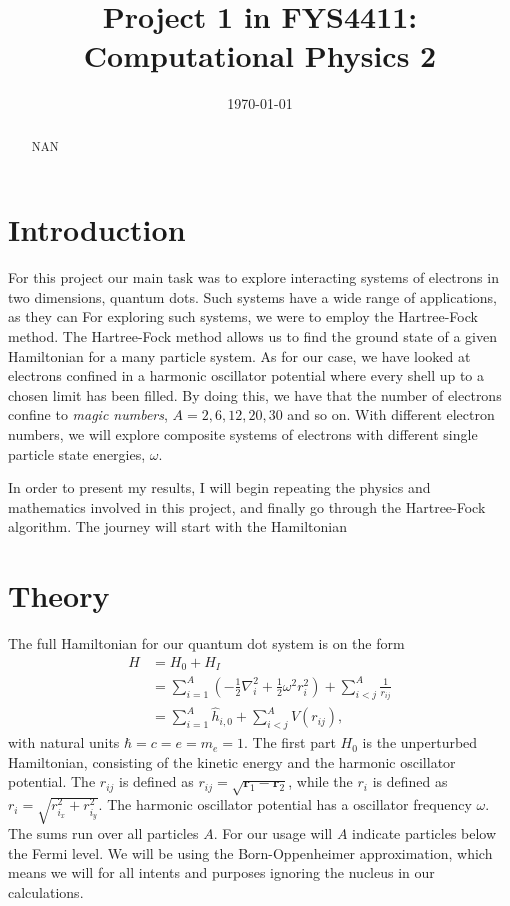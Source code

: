 \documentclass[11pt]{article}
\title{Project 1 in FYS4411: Computational Physics 2}
\author{}
\date{\today}
\begin{document}
\maketitle

\begin{abstract}
NAN
\end{abstract}

\section{Introduction}
For this project our main task was to explore interacting systems of electrons in two dimensions, quantum dots. Such systems have a wide range of applications, as they can  For exploring such systems, we were to employ the Hartree-Fock method. The Hartree-Fock method allows us to find the ground state of a given Hamiltonian for a many particle system. As for our case, we have looked at electrons confined in a harmonic oscillator potential where every shell up to a chosen limit has been filled. By doing this, we have that the number of electrons confine to \textit{magic numbers}, $A = 2, 6, 12, 20, 30$ and so on. With different electron numbers, we will explore composite systems of electrons with different single particle state energies, $\omega$.

In order to present my results, I will begin repeating the physics and mathematics involved in this project, and finally go through the Hartree-Fock algorithm. The journey will start with the Hamiltonian


\section{Theory}
The full Hamiltonian for our quantum dot system is on the form
\begin{align}
	H &= H_0 + H_I \nonumber \\
	&= \sum^A_{i=1} \left( -\frac{1}{2}\nabla^2_i + \frac{1}{2}\omega^2 r^2_i \right) + \sum^A_{i<j}\frac{1}{r_{ij}} \\
	&= \sum^A_{i=1} \hat{h}_{i,0} + \sum^A_{i<j}V(r_{ij}),
	\label{eq:full-hamiltonian}
\end{align}
with natural units $\hbar = c = e = m_e = 1$. The first part $H_0$ is the unperturbed Hamiltonian, consisting of the kinetic energy and the harmonic oscillator potential. The $r_{ij}$ is defined as $r_{ij} = \sqrt{\mathbf{r}_1 - \mathbf{r}_2}$, while the $r_i$ is defined as $r_i = \sqrt{r^2_{i_x} + r^2_{i_y}}$. The harmonic oscillator potential has a oscillator frequency $\omega$. The sums run over all particles $A$. For our usage will $A$ indicate particles below the Fermi level. We will be using the Born-Oppenheimer approximation, which means we will for all intents and purposes ignoring the nucleus in our calculations.
\end{document}
